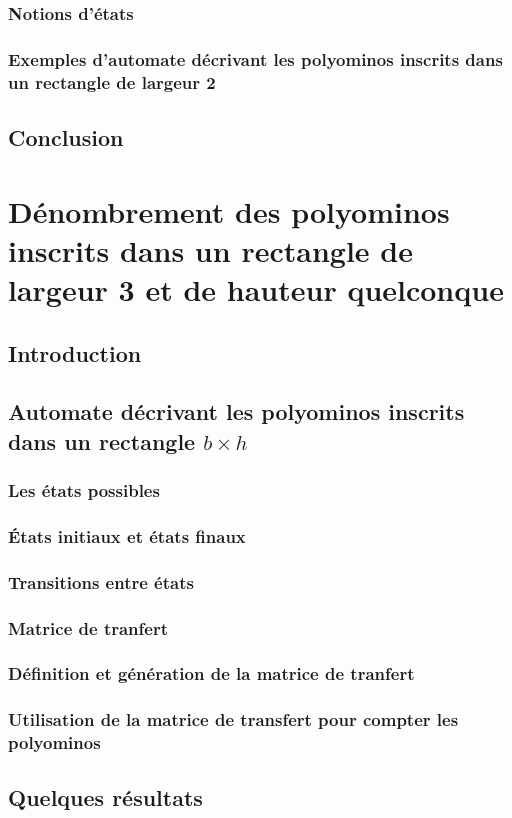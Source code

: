 \documentclass[12pt]{memoireuqam1.3}
\begin{document}
\subsection{Notions d'états}
\subsection{Exemples d'automate décrivant les polyominos inscrits dans un rectangle de largeur 2}
\section*{Conclusion}
\chapter{Dénombrement des polyominos inscrits dans un rectangle de largeur 3 et de hauteur quelconque}
\section*{Introduction}
\section{Automate décrivant les polyominos inscrits dans un rectangle $b\times h$}
\subsection{Les états possibles}
\subsection{États initiaux et états finaux}
\subsection{Transitions entre états}
\subsection{Matrice de tranfert}
\subsection{Définition et génération de la matrice de tranfert}
\subsection{Utilisation de la matrice de transfert pour compter les polyominos}
\section{Quelques résultats}
\end{document}
